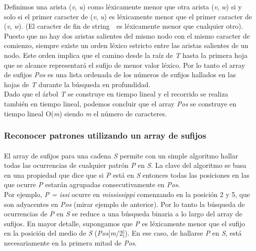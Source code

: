 \documentclass[es]{ifirak}
\begin{document}
Definimos una arista (\textit{v}, \textit{u}) como léxicamente menor que otra arista (\textit{v}, \textit{w}) si y solo si el primer caracter de (\textit{v}, \textit{u}) es léxicamente menor que el primer caracter de (\textit{v}, \textit{w}). (El caracter de fin de string $ $ \textdollar  $ $ es léxicamente menor que cualquier otro).\\

Puesto que no hay dos aristas salientes del mismo nodo con el mismo caracter de comienzo, siempre existe un orden léxico estricto entre las aristas salientes de un nodo. Este orden implica que el camino desde la raíz de \textit{T} hasta la primera hoja que se alcance representará el sufijo de menor valor léxico. Por lo tanto el array de sufijos \textit{Pos} es una lista ordenada de los números de sufijos hallados en las hojas de \textit{T} durante la búsqueda en profundidad.\\

Dado que el árbol \textit{T} se construye en tiempo lineal y el recorrido se realiza también en tiempo lineal, podemos concluir que el array \textit{Pos} se construye en tiempo lineal O(\textit{m}) siendo \textit{m} el número de caracteres.\\

\pagebreak
\subsubsection{Reconocer patrones utilizando un array de sufijos}
\paragraph{}
El array de sufijos para una cadena \textit{S} permite con un simple algoritmo hallar todas las ocurrencias de cualquier patrón \textit{P} en \textit{S}. La clave del algoritmo se basa en una propiedad que dice que si \textit{P} está en \textit{S} entonces todas las posiciones en las que ocurre \textit{P} estarán agrupadas consecutivamente en \textit{Pos}.\\

Por ejemplo, \textit{P = issi} ocurre en \textit{mississippi} comenzando en la posición 2 y 5, que son adyacentes en \textit{Pos} (mirar ejemplo de anterior). Por lo tanto la búsqueda de ocurrencias de \textit{P} en \textit{S} se reduce a una búsqueda binaria a lo largo del array de sufijos. En mayor detalle, supongamos que \textit{P} es léxicamente menor que el sufijo en la posición del medio de \textit{S} (\textit{Pos}[\textit{m}/2]). En ese caso, de hallarse \textit{P} en \textit{S}, está necesariamente en la primera mitad de \textit{Pos}.\\
\end{document}
